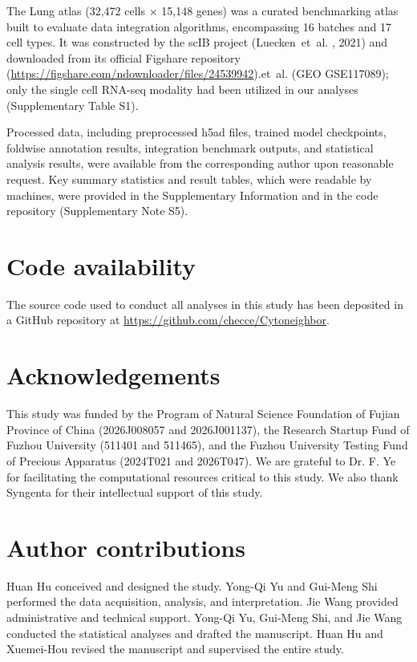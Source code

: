 \documentclass[11pt]{article}
\begin{document}
The Lung atlas (32,472 cells $\times$ 15,148 genes) was a curated benchmarking atlas built to evaluate data integration algorithms, encompassing 16 batches and 17 cell types. It was constructed by the scIB project (Luecken~et~al. , 2021) and downloaded from its official Figshare repository (\url{https://figshare.com/ndownloader/files/24539942}).et~al.  (GEO GSE117089); only the single cell RNA-seq modality had been utilized in our analyses (Supplementary Table S1).

Processed data, including preprocessed h5ad files, trained model checkpoints, foldwise annotation results, integration benchmark outputs, and statistical analysis results, were available from the corresponding author upon reasonable request. Key summary statistics and result tables, which were readable by machines, were provided in the Supplementary Information and in the code repository (Supplementary Note S5).


\section*{Code availability}
The source code used to conduct all analyses in this study has been deposited in a GitHub repository at \url{https://github.com/checce/Cytoneighbor}.


\section*{Acknowledgements}

This study was funded by the Program of Natural Science Foundation of Fujian Province of China (2026J008057 and 2026J001137), the Research Startup Fund of Fuzhou University (511401 and 511465), and the Fuzhou University Testing Fund of Precious Apparatus (2024T021 and 2026T047). We are grateful to Dr. F. Ye for facilitating the computational resources critical to this study. We also thank Syngenta for their intellectual support of this study.

\section*{Author contributions}

Huan Hu conceived and designed the study. Yong-Qi Yu and Gui-Meng Shi performed the data acquisition, analysis, and interpretation. Jie Wang provided administrative and technical support. Yong-Qi Yu, Gui-Meng Shi, and Jie Wang conducted the statistical analyses and drafted the manuscript. Huan Hu and Xuemei-Hou revised the manuscript and supervised the entire study.
\end{document}
